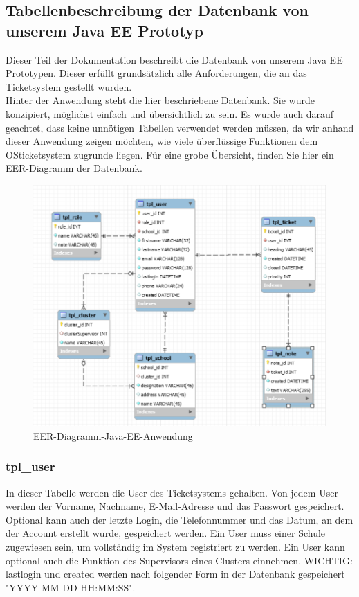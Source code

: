 \subsection{Tabellenbeschreibung der Datenbank von unserem Java EE Prototyp}
Dieser Teil der Dokumentation beschreibt die Datenbank von unserem Java EE Prototypen. Dieser erfüllt grundsätzlich alle Anforderungen, die an das Ticketsystem gestellt wurden.\\
Hinter der Anwendung steht die hier beschriebene Datenbank. Sie wurde konzipiert, möglichst einfach und übersichtlich zu sein. Es wurde auch darauf geachtet, dass keine unnötigen Tabellen verwendet werden müssen, da wir anhand dieser Anwendung zeigen möchten, wie viele überflüssige Funktionen dem OSticketsystem zugrunde liegen.
Für eine grobe Übersicht, finden Sie hier ein EER-Diagramm der Datenbank.
\begin{figure}[h]
	\centering
	\includegraphics[scale=.8]{figures/EER-Diagramm-Java-EE-Anwendung.PNG}
	\caption{EER-Diagramm-Java-EE-Anwendung}
	\label{EER-Diagramm-Java-EE-Anwendung}
\end{figure}

\newpage

\subsubsection{tpl\_user}

In dieser Tabelle werden die User des Ticketsystems gehalten. Von jedem User werden der Vorname, Nachname, E-Mail-Adresse und das Passwort gespeichert. Optional kann auch der letzte Login, die Telefonnummer und das Datum, an dem der Account erstellt wurde, gespeichert werden.
Ein User muss einer Schule zugewiesen sein, um vollständig im System registriert zu werden. Ein User kann optional auch die Funktion des Supervisors eines Clusters einnehmen.
WICHTIG: lastlogin und created werden nach folgender Form in der Datenbank gespeichert "YYYY-MM-DD HH:MM:SS".

